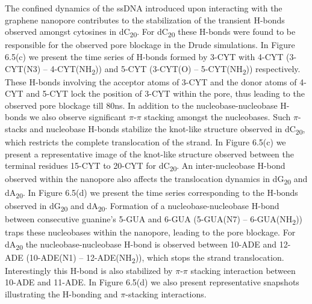 The confined dynamics of the ssDNA introduced upon interacting with the graphene nanopore contributes to the stabilization of the transient H-bonds observed amongst cytosines in dC\textsubscript{20}. For dC\textsubscript{20} these H-bonds were found to be responsible for the observed pore blockage in the Drude simulations. In Figure 6.5(c) we present the time series of H-bonds formed by 3-CYT with 4-CYT (3-CYT(N3) -- 4-CYT(NH\textsubscript{2})) and 5-CYT (3-CYT(O) -- 5-CYT(NH\textsubscript{2})) respectively. These H-bonds involving the acceptor atoms of 3-CYT and the donor atoms of 4-CYT and 5-CYT lock the position of 3-CYT within the pore, thus leading to the observed pore blockage till 80ns. In addition to the nucleobase-nucleobase H-bonds we also observe significant $\pi$-$\pi$ stacking amongst the nucleobases. Such $\pi$-stacks and nucleobase H-bonds stabilize the knot-like structure observed in dC\textsubscript{20}, which restricts the complete translocation of the strand. In Figure 6.5(c) we present a representative image of the knot-like structure observed between the terminal residues 15-CYT to 20-CYT for dC\textsubscript{20}. An inter-nucleobase H-bond observed within the nanopore also affects the translocation dynamics in dG\textsubscript{20} and dA\textsubscript{20}. In Figure 6.5(d) we present the time series corresponding to the H-bonds observed in dG\textsubscript{20} and dA\textsubscript{20}. Formation of a nucleobase-nucleobase H-bond between consecutive guanine’s 5-GUA and 6-GUA (5-GUA(N7) -- 6-GUA(NH\textsubscript{2})) traps these nucleobases within the nanopore, leading to the pore blockage. For dA\textsubscript{20} the nucleobase-nucleobase H-bond is observed between 10-ADE and 12-ADE (10-ADE(N1) -- 12-ADE(NH\textsubscript{2})), which stops the strand translocation. Interestingly this H-bond is also stabilized by $\pi$-$\pi$ stacking interaction between 10-ADE and 11-ADE. In Figure 6.5(d) we also present representative snapshots illustrating the H-bonding and $\pi$-stacking interactions. 

